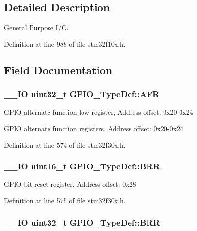 \subsection{Detailed Description}
General Purpose I/\-O. 

Definition at line 988 of file stm32f10x.\-h.



\subsection{Field Documentation}
\hypertarget{struct_g_p_i_o___type_def_af5b9bb2c6faec85580a3113de9af2fd0}{
\subsubsection[{A\-F\-R}]{\setlength{\rightskip}{0pt plus 5cm}\-\_\-\-\_\-\-I\-O {\bf uint32\-\_\-t} G\-P\-I\-O\-\_\-\-Type\-Def\-::\-A\-F\-R}}\label{struct_g_p_i_o___type_def_af5b9bb2c6faec85580a3113de9af2fd0}
G\-P\-I\-O alternate function low register, Address offset\-: 0x20-\/0x24

G\-P\-I\-O alternate function registers, Address offset\-: 0x20-\/0x24 

Definition at line 574 of file stm32f30x.\-h.

\hypertarget{struct_g_p_i_o___type_def_a08108dc67ac01f2d1c18a085c3bbffdd}{
\subsubsection[{B\-R\-R}]{\setlength{\rightskip}{0pt plus 5cm}\-\_\-\-\_\-\-I\-O {\bf uint16\-\_\-t} G\-P\-I\-O\-\_\-\-Type\-Def\-::\-B\-R\-R}}\label{struct_g_p_i_o___type_def_a08108dc67ac01f2d1c18a085c3bbffdd}
G\-P\-I\-O bit reset register, Address offset\-: 0x28 

Definition at line 575 of file stm32f30x.\-h.

\hypertarget{struct_g_p_i_o___type_def_aab918bfbfae459789db1fd0b220c7f21}{
\subsubsection[{B\-R\-R}]{\setlength{\rightskip}{0pt plus 5cm}\-\_\-\-\_\-\-I\-O {\bf uint32\-\_\-t} G\-P\-I\-O\-\_\-\-Type\-Def\-::\-B\-R\-R}}\label{struct_g_p_i_o___type_def_aab918bfbfae459789db1fd0b220c7f21}


